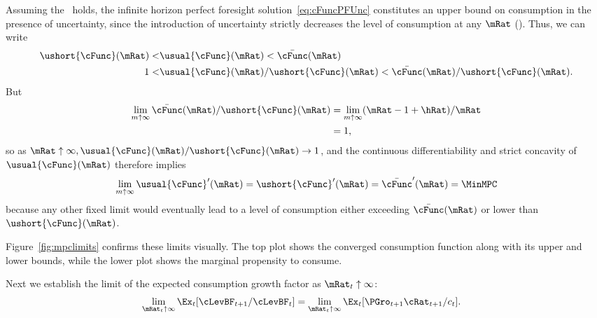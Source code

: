 \documentclass[BufferStockTheory]{subfiles}
\begin{document}
Assuming the \FHWC~holds, the infinite horizon perfect foresight solution~\eqref{eq:cFuncPFUnc} constitutes an upper bound on consumption in the presence of uncertainty, since the introduction of uncertainty strictly decreases the level of consumption at any $\mRat$ (\cite{ckConcavity}).  Thus, we can write
\begin{equation} \label{eq:lowerltupper}
  \begin{split}
    \ushort{\cFunc}(\mRat) < & \usual{\cFunc}(\mRat)  < \bar{\cFunc}(\mRat)  \\
    1 < & \usual{\cFunc}(\mRat)/\ushort{\cFunc}(\mRat)  < \bar{\cFunc}(\mRat)/\ushort{\cFunc}(\mRat). 
  \end{split}
\end{equation}
But
\begin{align*}%
  \lim_{m \uparrow \infty} \bar{\cFunc}(\mRat)/\ushort{\cFunc}(\mRat)
  & = \lim_{m \uparrow \infty} (\mRat -1+ \hRat)/\mRat  \\
  & = 1,
\end{align*}
so as $\mRat \uparrow \infty, \usual{\cFunc}(\mRat)/\ushort{\cFunc}(\mRat)
\rightarrow 1$, and the continuous differentiability and strict
concavity of $\usual{\cFunc}(\mRat)$ therefore implies
\begin{equation*} %
  \lim_{m \uparrow \infty} \usual{\cFunc}^{\prime}(\mRat) =
  \ushort{\cFunc}^{\prime}(\mRat) = \bar{\cFunc}^{\prime}(\mRat) = \MinMPC
\end{equation*}
because any other fixed limit would eventually lead to a level of
consumption either exceeding $\bar{\cFunc}(\mRat)$ or lower than
$\ushort{\cFunc}(\mRat)$.

Figure~\ref{fig:mpclimits} confirms these limits visually.  The top
plot shows the converged consumption function along with its upper and lower bounds,
while the lower plot shows the marginal propensity to consume.

\renewcommand{\figFile}{mpclimits}
\hypertarget{\figFile}{}


\renewcommand{\figFile}{cFuncBounds}
\hypertarget{\figFile}{}


Next we establish the limit of the expected consumption growth factor
as $\mRat_{t} \uparrow \infty$:
\begin{align*}
  \lim_{\mRat_{t} \uparrow \infty} \Ex_{t}[
  \cLevBF_{t+1}/\cLevBF_{t}]  & = \lim_{\mRat_{t} \uparrow \infty} \Ex_{t}[
                                {\PGro}_{t+1} {\cRat}_{t+1}/c_{t}].
\end{align*}
\end{document}
